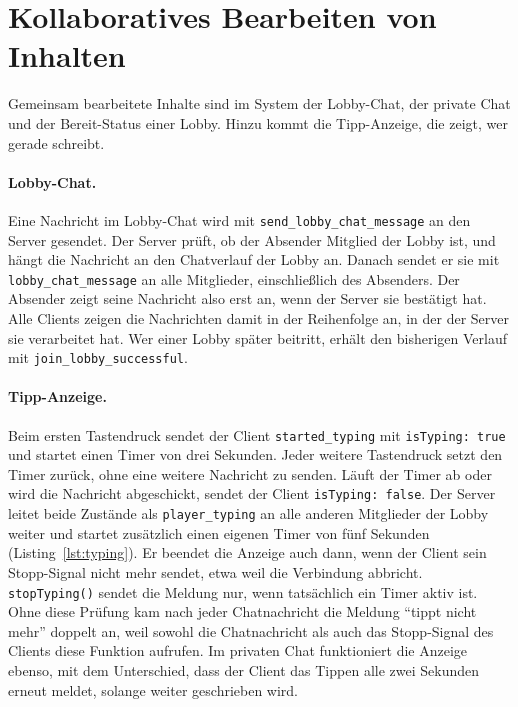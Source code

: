 \section{Kollaboratives Bearbeiten von Inhalten}
\label{sec:req-kollab}

Gemeinsam bearbeitete Inhalte sind im System der Lobby-Chat, der private Chat und der Bereit-Status einer Lobby. Hinzu kommt die Tipp-Anzeige, die zeigt, wer gerade schreibt.

\paragraph{Lobby-Chat.} Eine Nachricht im Lobby-Chat wird mit \texttt{send\_lobby\_chat\_message} an den Server gesendet. Der Server prüft, ob der Absender Mitglied der Lobby ist, und hängt die Nachricht an den Chatverlauf der Lobby an. Danach sendet er sie mit \texttt{lobby\_chat\_message} an alle Mitglieder, einschließlich des Absenders. Der Absender zeigt seine Nachricht also erst an, wenn der Server sie bestätigt hat. Alle Clients zeigen die Nachrichten damit in der Reihenfolge an, in der der Server sie verarbeitet hat. Wer einer Lobby später beitritt, erhält den bisherigen Verlauf mit \texttt{join\_lobby\_successful}.

\paragraph{Tipp-Anzeige.} Beim ersten Tastendruck sendet der Client \texttt{started\_typing} mit \texttt{isTyping: true} und startet einen Timer von drei Sekunden. Jeder weitere Tastendruck setzt den Timer zurück, ohne eine weitere Nachricht zu senden. Läuft der Timer ab oder wird die Nachricht abgeschickt, sendet der Client \texttt{isTyping: false}. Der Server leitet beide Zustände als \texttt{player\_typing} an alle anderen Mitglieder der Lobby weiter und startet zusätzlich einen eigenen Timer von fünf Sekunden (Listing~\ref{lst:typing}). Er beendet die Anzeige auch dann, wenn der Client sein Stopp-Signal nicht mehr sendet, etwa weil die Verbindung abbricht. \texttt{stopTyping()} sendet die Meldung nur, wenn tatsächlich ein Timer aktiv ist. Ohne diese Prüfung kam nach jeder Chatnachricht die Meldung \enquote{tippt nicht mehr} doppelt an, weil sowohl die Chatnachricht als auch das Stopp-Signal des Clients diese Funktion aufrufen. Im privaten Chat funktioniert die Anzeige ebenso, mit dem Unterschied, dass der Client das Tippen alle zwei Sekunden erneut meldet, solange weiter geschrieben wird.

